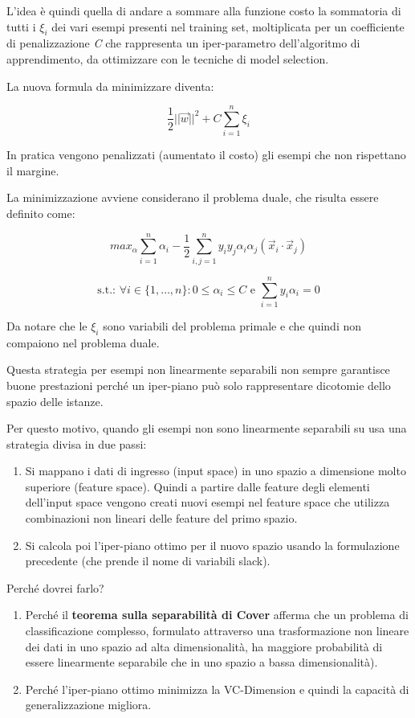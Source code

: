 L'idea è quindi quella di andare a sommare alla funzione costo la sommatoria di tutti i $\xi_i$ dei vari esempi presenti nel training set, moltiplicata per un coefficiente di penalizzazione \textit{C} che rappresenta un iper-parametro dell'algoritmo di apprendimento, da ottimizzare con le tecniche di model selection.

La nuova formula da minimizzare diventa:

$$ \frac{1}{2}||\vec{w}||^2 + C \sum\limits_{i=1}^n \xi_i $$

In pratica vengono penalizzati (aumentato il costo) gli esempi che non rispettano il margine.

La minimizzazione avviene considerano il problema duale, che risulta essere definito come:

$$max_\alpha \sum\limits_{i=1}^n \alpha_i - \frac{1}{2}\sum\limits_{i,j = 1}^n y_i y_j \alpha_i \alpha_j (\vec{x}_i \cdot \vec{x}_j)$$

$$ \text{s.t.: } \forall i \in \{1, \ldots, n\} : 0 \leq \alpha_i \leq C \text{ e } \sum\limits_{i=1}^n y_i \alpha_i = 0$$

Da notare che le $\xi_i$ sono variabili del problema primale e che quindi non compaiono nel problema duale.

Questa strategia per esempi non linearmente separabili non sempre
garantisce buone prestazioni perché un iper-piano può solo rappresentare
dicotomie dello spazio delle istanze.

Per questo motivo, quando gli esempi non sono linearmente separabili su
usa una strategia divisa in due passi:

\begin{enumerate}
\item
  Si mappano i dati di ingresso (input space) in uno spazio a dimensione
  molto superiore (feature space). Quindi a partire dalle feature degli
  elementi dell'input space vengono creati nuovi esempi nel feature
  space che utilizza combinazioni non lineari delle feature del primo
  spazio.
\item
  Si calcola poi l'iper-piano ottimo per il nuovo spazio usando la
  formulazione precedente (che prende il nome di variabili slack).
\end{enumerate}

Perché dovrei farlo?

\begin{enumerate}
\item
  Perché il \textbf{teorema sulla separabilità di Cover} afferma che un problema di classificazione complesso, formulato
  attraverso una trasformazione non lineare dei dati in uno spazio ad
  alta dimensionalità, ha maggiore probabilità di essere linearmente
  separabile che in uno spazio a bassa dimensionalità).
\item
  Perché l'iper-piano ottimo minimizza la VC-Dimension e quindi la
  capacità di generalizzazione migliora.
\end{enumerate}

